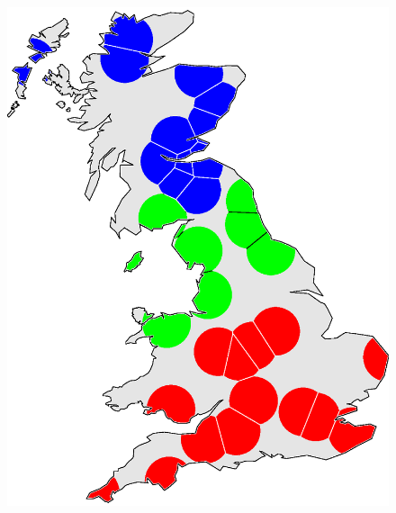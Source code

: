 \documentclass[output=paper]{LSP/langsci}
\begin{document}
\begin{figure} [tbp]
\begin{minipage}[b]{0.30\linewidth} %
    \centering
    \includegraphics [keepaspectratio,width=.98\textwidth] {illustrations/wolk_WARD_crowdist_hard.eps}
\end{minipage}
\hspace{0.5cm} %
\begin{minipage}[b]{0.30\linewidth}
    \centering

\end{minipage}
\end{figure}
\end{document}
